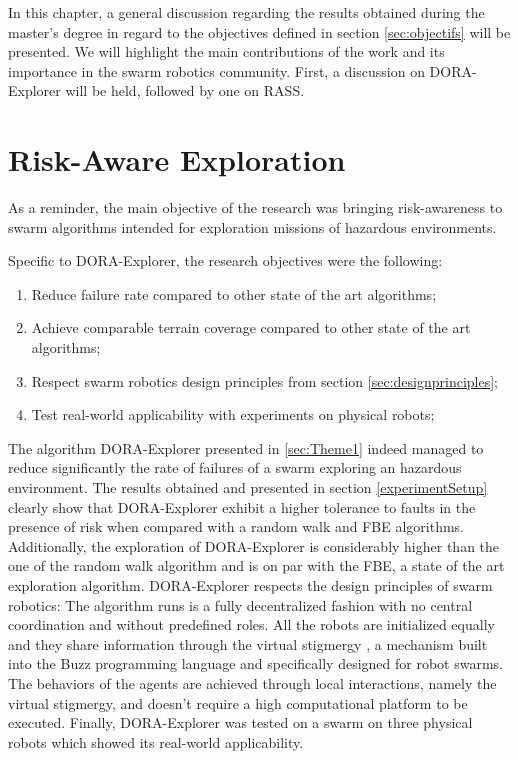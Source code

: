 \label{sec:discussion}
In this chapter, a general discussion regarding the results obtained during the master's degree in regard to the objectives defined in section \ref{sec:objectifs} will be presented. We will highlight the main contributions of the work and its importance in the swarm robotics community. First, a discussion on DORA-Explorer will be held, followed by one on RASS. 

\section{Risk-Aware Exploration}
As a reminder, the main objective of the research was bringing risk-awareness to swarm algorithms intended for exploration missions of hazardous environments.

Specific to DORA-Explorer, the research objectives were the following:

\begin{enumerate}
    \item Reduce failure rate compared to other state of the art algorithms;
    \item Achieve comparable terrain coverage compared to other state of the art algorithms;
    \item Respect swarm robotics design principles from section \ref{sec:designprinciples};
    \item Test real-world applicability with experiments on physical robots;
\end{enumerate}

The algorithm DORA-Explorer presented in \ref{sec:Theme1} indeed managed to reduce significantly the rate of failures of a swarm exploring an hazardous environment. The results obtained and presented in section \ref{experimentSetup} clearly show that DORA-Explorer exhibit a higher tolerance to faults in the presence of risk when compared with a random walk and FBE algorithms. Additionally, the exploration of DORA-Explorer is considerably higher than the one of the random walk algorithm and is on par with the FBE, a state of the art exploration algorithm. DORA-Explorer respects the design principles of swarm robotics: The algorithm runs is a fully decentralized fashion with no central coordination and without predefined roles. All the robots are initialized equally and they share information through the virtual stigmergy \cite{pinciroliTuple2016}, a mechanism built into the Buzz programming language \cite{pinciroliBuzz2016} and specifically designed for robot swarms. The behaviors of the agents are achieved through local interactions, namely the virtual stigmergy, and doesn't require a high computational platform to be executed. Finally, DORA-Explorer was tested on a swarm on three physical robots which showed its real-world applicability. 

